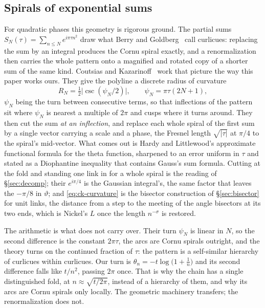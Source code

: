 \documentclass[11pt]{article}
\theoremstyle{definition}
\begin{document}
\subsection{Spirals of exponential sums}\label{sec:curlicues}

For quadratic phases this geometry is rigorous ground. The partial sums
$S_N(\tau)=\sum_{n\le N}e^{i\pi\tau n^{2}}$ draw what Berry and
Goldberg~\cite{BerryGoldberg1988} call curlicues: replacing the sum by an
integral produces the Cornu spiral exactly, and a renormalization then carries
the whole pattern onto a magnified and rotated copy of a shorter sum of the same
kind. Coutsias and Kazarinoff~\cite{CoutsiasKazarinoff1987,CoutsiasKazarinoff1998}
work that picture the way this paper works ours. They give the polyline a
discrete radius of curvature
\begin{equation}\label{eq:ck-curvature}
R_N=\tfrac12\bigl|\csc(\psi_N/2)\bigr|,
\qquad \psi_N=\pi\tau(2N+1),
\end{equation}
$\psi_N$ being the turn between consecutive terms, so that inflections of the
pattern sit where $\psi_N$ is nearest a multiple of $2\pi$ and cusps where it
turns around. They then cut the sum \emph{at an inflection}, and replace each
whole spiral of the first sum by a single vector carrying a scale and a phase,
the Fresnel length $\sqrt{|\tau|}$ at $\pi/4$ to the spiral's mid-vector. What
comes out is Hardy and Littlewood's approximate functional formula for the theta
function, sharpened to an error uniform in $\tau$ and stated as a Diophantine
inequality that contains Gauss's sum formula. Cutting at the fold and standing
one link in for a whole spiral is the reading of \S\ref{sec:decomp}; their
$e^{i\pi/4}$ is the Gaussian integral's, the same factor that leaves the
$-\pi/8$ in $\vartheta$; and \eqref{eq:ck-curvature} is the bisector construction of
\S\ref{sec:bisector} for unit links, the distance from a step to the meeting of
the angle bisectors at its two ends, which is Nickel's $L$ once the length
$n^{-\sigma}$ is restored.

The arithmetic is what does not carry over. Their turn $\psi_N$ is linear in
$N$, so the second difference is the constant $2\pi\tau$, the arcs are Cornu
spirals outright, and the theory turns on the continued fraction of $\tau$:
the pattern is a self-similar hierarchy of curlicues within curlicues. Our turn
is $\theta_n=-t\log\bigl(1+\tfrac1n\bigr)$ and its second difference falls like
$t/n^{2}$, passing $2\pi$ once. That is why the chain has a single distinguished
fold, at $n\approx\sqrt{t/2\pi}$, instead of a hierarchy of them, and why its
arcs are Cornu spirals only locally. The geometric machinery transfers; the
renormalization does not.
\end{document}
